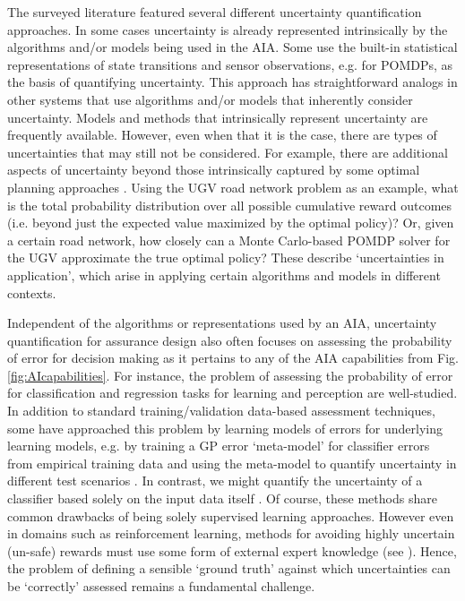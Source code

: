     The surveyed literature  featured several different uncertainty quantification approaches. In some cases uncertainty is already represented intrinsically by the algorithms and/or models being used in the AIA. Some use the built-in statistical representations of state transitions and sensor observations, e.g. for POMDPs, as the basis of quantifying uncertainty. This approach has straightforward analogs in other systems that use algorithms and/or models that inherently consider uncertainty. Models and methods that intrinsically represent uncertainty are frequently available. However, even when that it is the case, there are types of uncertainties that may still not be considered. For example, there are additional aspects of uncertainty beyond those intrinsically captured by some optimal planning approaches \cite{Aitken2016-cv,Kuter2015-qh}. Using the UGV road network problem as an example, what is the total probability distribution over all possible cumulative reward outcomes (i.e. beyond just the expected value maximized by the optimal policy)? Or, given a certain road network, how closely can a Monte Carlo-based POMDP solver for the UGV approximate the true optimal policy? These describe `uncertainties in application', which arise in applying certain algorithms and models in different contexts.

    Independent of the algorithms or representations used by an AIA, uncertainty quantification for assurance design also often focuses on assessing the probability of error for decision making as it pertains to any of the AIA capabilities from Fig. \ref{fig:AIcapabilities}. For instance, the problem of assessing the probability of error for classification and regression tasks for learning and perception are well-studied. In addition to standard training/validation data-based assessment techniques, some have approached this problem by learning models of errors for underlying learning models, e.g. by training a GP error `meta-model' for classifier errors  from empirical training data and using the meta-model to quantify uncertainty in different test scenarios \cite{Gurau2016-hs}. In contrast, we might quantify the uncertainty of a classifier based solely on the input data itself \cite{Zhang2014-he}. Of course, these methods share common drawbacks of being solely supervised learning approaches. However even in domains such as reinforcement learning, methods for avoiding highly uncertain (un-safe) rewards must use some form of external expert knowledge (see \cite{Garcia2015-rs, Lipton2016-dq}). Hence, the problem of defining a sensible `ground truth' against which uncertainties can be `correctly' assessed remains a fundamental challenge. %

